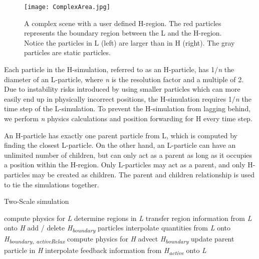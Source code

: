 \documentclass[../../main.tex]{subfiles}
\begin{document}
\begin{figure}[h!]
    \centering
    \texttt{[image: ComplexArea.jpg]}
    \caption[Complex scene with user defined H-region]{A complex scene with a user defined H-region. The red particles represents the boundary region between the L and the H-region. Notice the particles in L (left) are larger than in H (right). The gray particles are static particles.
    }
    \label{fig:complexarea}
\end{figure}

Each particle in the H-simulation, referred to as an H-particle, has 1$/$\textit{n} the diameter of an L-particle, where \textit{n} is the resolution factor and a multiple of 2. Due to instability risks introduced by using smaller particles which can more easily end up in physically incorrect positions, the H-simulation requires 1$/$\textit{n} the time step of the L-simulation. To prevent the H-simulation from lagging behind, we perform \textit{n} physics calculations and position forwarding for H every time step. 

An H-particle has exactly one parent particle from L, which is computed by finding the closest L-particle. On the other hand, an L-particle can have an unlimited number of children, but can only act as a parent as long as it occupies a position within the H-region. Only L-particles may act as a parent, and only H-particles may be created as children. The parent and children relationship is used to tie the simulations together. 

\begin{algorithm}[h]
    \caption{Two-Scale simulation}
    \label{alg:twoscale}
    \begin{algorithmic}[1]
        \State compute physics for \textit{L}
        \State determine regions in \textit{L}
        \State transfer region information from \textit{L} onto \textit{H}
        \State add / delete \textit{\texorpdfstring{H\textsubscript{boundary}}{H boundary}} particles
        \State interpolate quantities from \textit{L} onto \textit{\texorpdfstring{H\textsubscript{boundary, activeRelax}}{H boundary, activeRelax}}
                \State compute physics for \textit{H}
            \State advect \textit{\texorpdfstring{H\textsubscript{boundary}}{H boundary}}
        \EndFor
        \State update parent particle in \textit{H}
        \State interpolate feedback information from \textit{{\texorpdfstring{H\textsubscript{active}}{H active}}} onto \textit{L}
        \EndWhile
   \end{algorithmic}
\end{algorithm}
\end{document}

